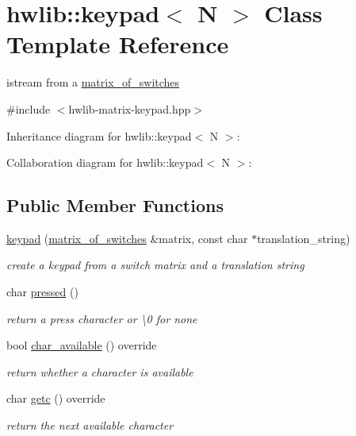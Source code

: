 \hypertarget{classhwlib_1_1keypad}{}\section{hwlib\+:\+:keypad$<$ N $>$ Class Template Reference}
\label{classhwlib_1_1keypad}


istream from a \hyperlink{classhwlib_1_1matrix__of__switches}{matrix\+\_\+of\+\_\+switches}  




{\ttfamily \#include $<$hwlib-\/matrix-\/keypad.\+hpp$>$}



Inheritance diagram for hwlib\+:\+:keypad$<$ N $>$\+:


Collaboration diagram for hwlib\+:\+:keypad$<$ N $>$\+:
\subsection*{Public Member Functions}
\begin{DoxyCompactItemize}
\item 
\hyperlink{classhwlib_1_1keypad_a6bb965d7739192e6868a392697b6863c}{keypad} (\hyperlink{classhwlib_1_1matrix__of__switches}{matrix\+\_\+of\+\_\+switches} \&matrix, const char $\ast$translation\+\_\+string)
\begin{DoxyCompactList}\small\item\em create a keypad from a switch matrix and a translation string \end{DoxyCompactList}\item 
char \hyperlink{classhwlib_1_1keypad_a34f0f6c0cea1702e84b9f20a9379d8a8}{pressed} ()
\begin{DoxyCompactList}\small\item\em return a press character or \textquotesingle{}\textbackslash{}0\textquotesingle{} for none \end{DoxyCompactList}\item 
bool \hyperlink{classhwlib_1_1keypad_a9bef86eba2e6ac84c014a1577f44cd9c}{char\+\_\+available} () override
\begin{DoxyCompactList}\small\item\em return whether a character is available \end{DoxyCompactList}\item 
char \hyperlink{classhwlib_1_1keypad_aa2a2ab2fca1de5daa5587b3433c8e74a}{getc} () override
\begin{DoxyCompactList}\small\item\em return the next available character \end{DoxyCompactList}\end{DoxyCompactItemize}


